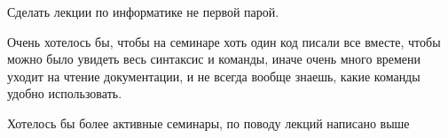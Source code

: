         \begin{commentbox}
            Сделать лекции по информатике не первой парой.
        \end{commentbox}

        \begin{commentbox}
            Очень хотелось бы, чтобы на семинаре хоть один код писали все вместе, чтобы можно было увидеть весь синтаксис и команды, иначе очень много времени уходит на чтение документации, и не всегда вообще знаешь, какие команды удобно использовать.
        \end{commentbox}

        \begin{commentbox}
            Хотелось бы более активные семинары, по поводу лекций написано выше
        \end{commentbox}